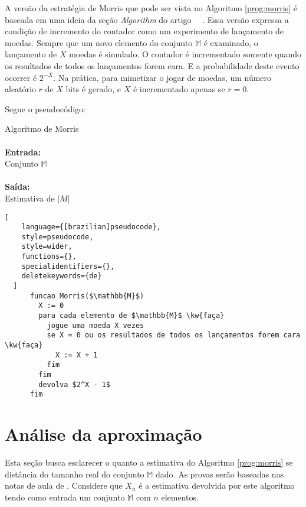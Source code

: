 A versão da estratégia de Morris que pode ser vista no Algoritmo \ref{prog:morris}
é baseada em uma ideia da seção \textit{Algorithm} do artigo ~~\citep{ApproximateCountingAlgorithm}.
Essa versão expressa a condição de incremento do contador como um experimento de lançamento de moedas. 
Sempre que um novo elemento do conjunto $\mathbb{M}$ é examinado, o lançamento de $X$ moedas é simulado. 
O contador é incrementado somente quando os resultados de todos os lançamentos forem cara.
E a probabilidade deste evento ocorrer é $2^{-X}$. Na prática, para mimetizar o jogar de moedas, 
um número aleatório $r$ de $X$ bits é gerado, e $X$ é incrementado apenas se $r = 0$.

Segue o pseudocódigo:
\begin{programruledcaption}{
Algoritmo de Morris\label{prog:morris}\\
\\ \textbf{Entrada:} \\
\hspace*{1cm} Conjunto $\mathbb{M}$ \\
\\ \textbf{Saída:} \\
\hspace*{1cm} Estimativa de $|M|$
\\
\label{prog:flajolet-martin}
}
  \begin{lstlisting}[
    language={[brazilian]pseudocode},
    style=pseudocode,
    style=wider,
    functions={},
    specialidentifiers={},
    deletekeywords={de}
  ]
      funcao Morris($\mathbb{M}$) 
        X := 0
        para cada elemento de $\mathbb{M}$ \kw{faça}
          jogue uma moeda X vezes
          se X = 0 ou os resultados de todos os lançamentos forem cara \kw{faça}
            X := X + 1
          fim
        fim
        devolva $2^X - 1$
      fim
  \end{lstlisting}
\end{programruledcaption}

\section{Análise da aproximação}
\label{sec:morris:analysis}

Esta seção busca esclarecer o quanto a estimativa do Algoritmo \ref{prog:morris} se distância do tamanho real do conjunto $\mathbb{M}$ dado. As provas
serão baseadas nas notas de aula de \citep{LectureNotesAndoni}.
Considere que $X_n$ é a estimativa devolvida por este algoritmo tendo como entrada um conjunto $\mathbb{M}$ com $n$ elementos.

